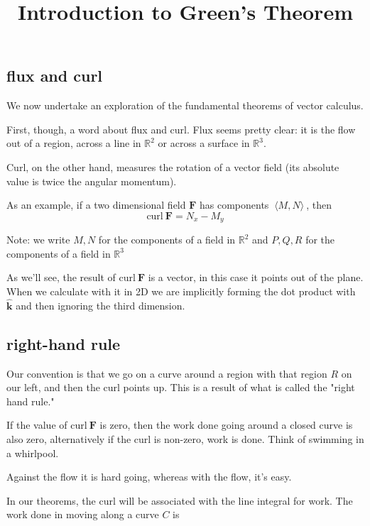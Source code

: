 \documentclass[11pt, oneside]{article}
\title{Introduction to Green's Theorem}
\date{}
\begin{document}
\maketitle
\Large

\label{sec:green}

\subsection*{flux and curl}

We now undertake an exploration of the fundamental theorems of vector calculus.

First, though, a word about flux and curl.  Flux seems pretty clear:  it is the flow out of a region, across a line in $\mathbb{R}^2$ or across a surface in $\mathbb{R}^3$.

Curl, on the other hand, measures the rotation of a vector field (its absolute value is twice the angular momentum).  

As an example, if a two dimensional field $\mathbf{F}$ has components $\ \langle M,N \rangle \ $, then
\[ \text{curl} \ \mathbf{F} = N_x - M_y \]

Note:  we write $M,N$ for the components of a field in $\mathbb{R}^2$ and $P,Q,R$ for the components of a field in $\mathbb{R}^3$

As we'll see, the result of $\text{curl} \ \mathbf{F}$ is a vector, in this case it points out of the plane.  When we calculate with it in 2D we are implicitly forming the dot product with $\hat{\mathbf{k}}$ and then ignoring the third dimension.

\subsection*{right-hand rule}

Our convention is that we go on a curve around a region with that region $R$ on our left, and then the curl points up.  This is a result of what is called the "right hand rule."

If the value of $\text{curl} \ \mathbf{F}$ is zero, then the work done going around a closed curve is also zero, alternatively if the curl is non-zero, work is done.  Think of swimming in a whirlpool.

Against the flow it is hard going, whereas with the flow, it's easy.

In our theorems, the curl will be associated with the line integral for work.  The work done in moving along a curve $C$ is
\end{document}
